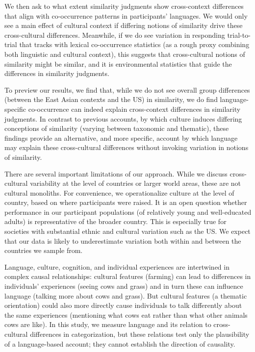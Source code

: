 \documentclass[10pt, letterpaper]{article}
\begin{document}
We then ask to what extent similarity judgments show cross-context
differences that align with co-occurrence patterns in participants'
languages. We would only see a main effect of cultural context if
differing notions of similarity drive these cross-cultural differences.
Meanwhile, if we do see variation in responding trial-to-trial that
tracks with lexical co-occurrence statistics (as a rough proxy combining
both linguistic and cultural context), this suggests that cross-cultural
notions of similarity might be similar, and it is environmental
statistics that guide the differences in similarity judgments.

To preview our results, we find that, while we do not see overall group
differences (between the East Asian contexts and the US) in similarity,
we do find language-specific co-occurrence can indeed explain
cross-context differences in similarity judgments. In contrast to
previous accounts, by which culture induces differing conceptions of
similarity (varying between taxonomic and thematic), these findings
provide an alternative, and more specific, account by which language may
explain these cross-cultural differences without invoking variation in
notions of similarity.

There are several important limitations of our approach. While we
discuss cross-cultural variability at the level of countries or larger
world areas, these are not cultural monoliths. For convenience, we
operationalize culture at the level of country, based on where
participants were raised. It is an open question whether performance in
our participant populations (of relatively young and well-educated
adults) is representative of the broader country. This is especially
true for societies with substantial ethnic and cultural variation such
as the US. We expect that our data is likely to underestimate variation
both within and between the countries we sample from.

Language, culture, cognition, and individual experiences are intertwined
in complex causal relationships: cultural features (farming) can lead to
differences in individuals' experiences (seeing cows and grass) and in
turn these can influence language (talking more about cows and grass).
But cultural features (a thematic orientation) could also more directly
cause individuals to talk differently about the same experiences
(mentioning what cows eat rather than what other animals cows are like).
In this study, we measure language and its relation to cross-cultural
differences in categorization, but these relations test only the
plausibility of a language-based account; they cannot establish the
direction of causality.
\end{document}
